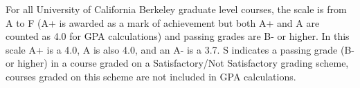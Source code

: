 \documentclass[
]{article}
\begin{document}
For all University of California Berkeley graduate level courses, the
scale is from A to F (A+ is awarded as a mark of achievement but both A+
and A are counted as 4.0 for GPA calculations) and passing grades are B-
or higher. In this scale A+ is a 4.0, A is also 4.0, and an A- is a 3.7.
S indicates a passing grade (B- or higher) in a course graded on a
Satisfactory/Not Satisfactory grading scheme, courses graded on this
scheme are not included in GPA calculations.
\end{document}
